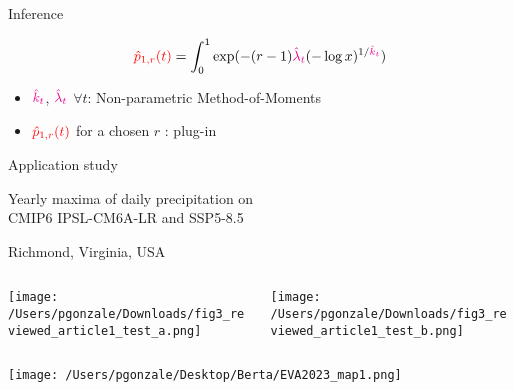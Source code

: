 \documentclass[9pt,compress]{beamer}
\begin{document}
%
%
%
\begin{frame}{Inference}
\begin{tcolorbox}[title= A plug-in strategy]
$${\color{red}\hat{p}_{1,r}(t)} = \int_0^1\exp(-(r-1){\color{magenta}\hat \lambda_t}(-\log x)^{1/{\color{magenta}\hat k_t}})$$ 
\begin{itemize}
	\item ${\color{magenta}\hat{k}_t}$, ${\color{magenta}\hat{\lambda}_t}$ $\forall t $: Non-parametric Method-of-Moments 
	\item ${\color{red}\hat{p}_{1,r}(t)}$ for a chosen $r$ : plug-in
\end{itemize}
\end{tcolorbox}
\end{frame}
%
%
%
\begin{frame}{Application study}
\begin{center}
\LARGE {\color{beamer@blendedblue}Yearly maxima of daily precipitation on \\
CMIP6 IPSL-CM6A-LR and SSP5-8.5}
\end{center}
\end{frame}
%
%
%
\begin{frame}{Richmond, Virginia, USA}
\begin{columns}
\begin{column}{0.5\textwidth}
\begin{center}
\texttt{[image: /Users/pgonzale/Downloads/fig3\_reviewed\_article1\_test\_a.png]}
 \end{center}  
 \end{column}
 \pause
 \begin{column}{0.5\textwidth}
\begin{center}
\texttt{[image: /Users/pgonzale/Downloads/fig3\_reviewed\_article1\_test\_b.png]}
 \end{center}    
 \end{column}
 \end{columns}
\end{frame}
%
%
%
\begin{frame}%
\begin{center}
\texttt{[image: /Users/pgonzale/Desktop/Berta/EVA2023\_map1.png]}
\end{center}    
\end{frame}
\end{document}
